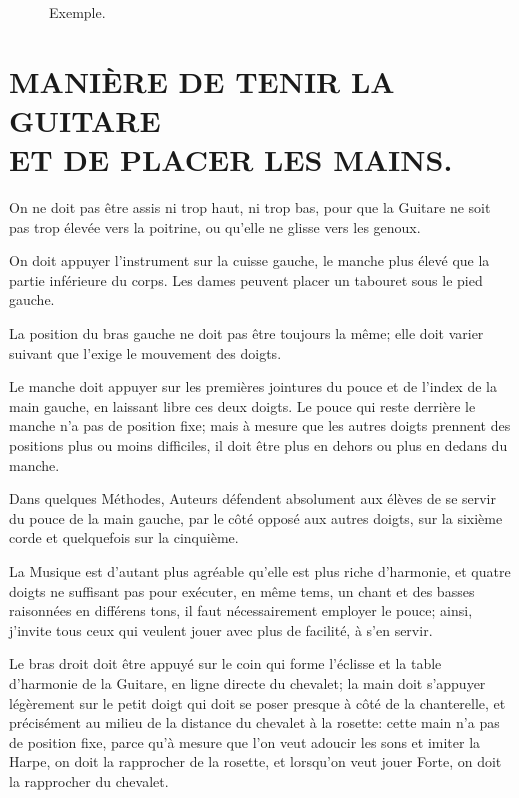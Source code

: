 \documentclass[a4paper]{book}
\begin{document}
\begin{figure}[h]
  \centering
  \caption{Exemple.}
  \label{fig:strings}
\end{figure}

\chapter[La manière de tenir la guitare et de placer les mains]{%
  MANIÈRE DE TENIR LA GUITARE\\
  \footnotesize ET DE PLACER LES MAINS.}

On ne doit pas être assis ni trop haut, ni trop bas, pour que la Guitare ne soit pas trop élevée vers la poitrine, ou qu'elle ne glisse vers les genoux.

On doit appuyer l'instrument sur la cuisse gauche, le manche plus élevé que la partie inférieure du corps.  Les dames peuvent placer un tabouret sous le pied gauche.

La position du bras gauche ne doit pas être toujours la même; elle doit varier suivant que l'exige le mouvement des doigts.

Le manche doit appuyer sur les premières jointures du pouce et de l'index de la main gauche, en laissant libre ces deux doigts.  Le pouce qui reste derrière le manche n'a pas de position fixe; mais à mesure que les autres doigts prennent des positions plus ou moins difficiles, il doit être plus en dehors ou plus en dedans du manche.

Dans quelques Méthodes, Auteurs défendent absolument aux élèves de se servir du pouce de la main gauche, par le côté opposé aux autres doigts, sur la sixième corde et quelquefois sur la cinquième.
\clearpage

La Musique est d'autant plus agréable qu'elle est plus riche d'harmonie, et quatre doigts ne suffisant pas pour exécuter, en même tems, un chant et des basses raisonnées en différens tons, il faut nécessairement employer le pouce; ainsi, j'invite tous ceux qui veulent jouer avec plus de facilité, à s'en servir.

Le bras droit doit être appuyé sur le coin qui forme l'éclisse et la table d'harmonie de la Guitare, en ligne directe du chevalet; la main doit s'appuyer légèrement sur le petit doigt qui doit se poser presque à côté de la chanterelle, et précisément au milieu de la distance du chevalet à la rosette: cette main n'a pas de position fixe, parce qu'à mesure que l'on veut adoucir les sons et imiter la Harpe, on doit la rapprocher de la rosette, et lorsqu'on veut jouer Forte, on doit la rapprocher du chevalet.
\end{document}
